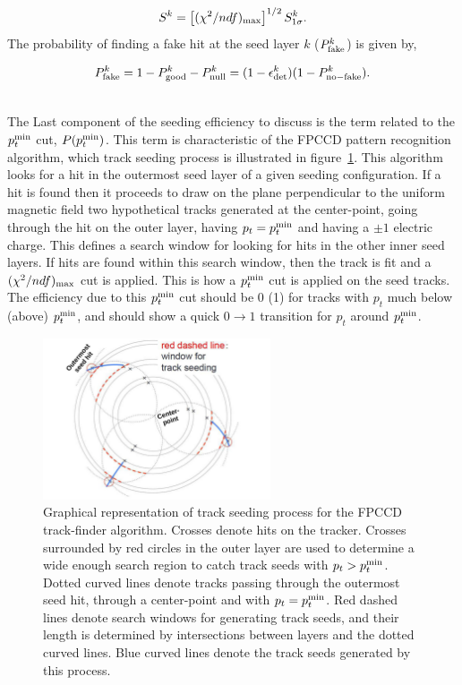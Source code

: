 \begin{equation}
  S^k = \left[(\chi^2/ndf)_{\rm max}\right]^{1/2} S^k_{1\sigma}.
\end{equation}
\noindent
The probability of finding a fake hit at the seed layer $k$ ($P^k_{\rm fake}$) is given by,

\begin{equation}
  P^k_{\rm fake} = 1 - P^k_{\rm good} - P^k_{\rm null} = (1 - \epsilon^k_{\rm det}) (1 - P^k_{\rm no-fake}).
\end{equation}

~\\
\noindent
The Last component of the seeding efficiency to discuss is the term related to the $p^{\rm min}_t$ cut, $P(p^{\rm min}_t)$. This term is characteristic of the FPCCD pattern 
recognition algorithm, which track seeding process is illustrated in figure~\ref{fig:FPCCD_Seeding}. This algorithm looks for a hit in the outermost seed layer of a given 
seeding configuration. If a hit is found then it proceeds to draw on the plane perpendicular to the uniform magnetic field two hypothetical tracks generated at the center-point, 
going through the hit on the outer layer, having $p_t = p^{\rm min}_t$ and having a $\pm1$ electric charge. This defines a search window for looking for hits in the other inner seed 
layers. If hits are found within this search window, then the track is fit and a $(\chi^2/ndf)_{\rm max}$ cut is applied. This is how a $p^{\rm min}_t$ cut is applied on the seed 
tracks. The efficiency due to this $p^{\rm min}_t$ cut should be 0 (1) for tracks with $p_t$ much below (above) $p^{\rm min}_t$, and should show a quick $0 \rightarrow 1$ transition 
for $p_t$ around $p^{\rm min}_t$.

\begin{figure}
  \centering
  \includegraphics[width=0.6\textwidth]{figures/FPCCD_Seeding.pdf}
  \caption{Graphical representation of track seeding process for the FPCCD track-finder algorithm. Crosses denote hits on the tracker. 
  Crosses surrounded by red circles in the outer layer are used to determine a wide enough search region to catch track seeds with $p_t > p^{\rm min}_t$. 
  Dotted curved lines denote tracks passing through the outermost seed hit, through a center-point and with $p_t = p^{\rm min}_t$. Red dashed lines 
  denote search windows for generating track seeds, and their length is determined by intersections between layers and the dotted curved lines. Blue 
  curved lines denote the track seeds generated by this process.}
  \label{fig:FPCCD_Seeding}
\end{figure}

